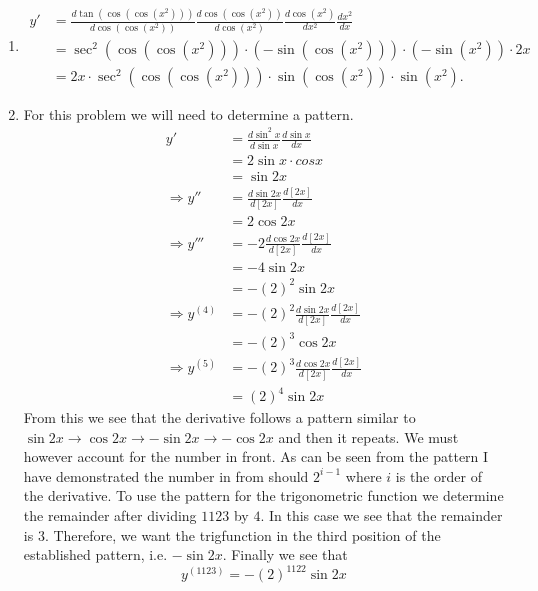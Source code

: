 \documentclass{hwset}
\begin{document}
\begin{enumerate}
	\item \begin{solution}
		\begin{align*}
			y' &= \frac{d\tan(\cos(\cos(x^2)))}{d\cos(\cos(x^2))}
			\frac{d\cos(\cos(x^2))}{d\cos(x^2)} \frac{d\cos(x^2)}{dx^2} \frac{dx^2}{dx}\\
			&= \sec^2(\cos(\cos(x^2)))\cdot \left( -\sin(\cos(x^2)) \right)\cdot
				\left( -\sin(x^2) \right)\cdot 2x \\
			&= \boxed{2x\cdot \sec^2(\cos(\cos(x^2)))\cdot \sin(\cos(x^2))\cdot
				\sin(x^2)}.
		\end{align*}
	\end{solution}
	\item \begin{solution} For this problem we will need to determine a pattern.
		\begin{align*}
			y' &= \frac{d\sin^2 x}{d\sin x}\frac{d\sin x}{dx}\\
			&= 2\sin x \cdot cos x \\
			&= \sin 2x \\
			\Rightarrow y'' &= \frac{d\sin 2x}{d[2x]}\frac{d[2x]}{dx} \\
			&= 2\cos 2x \\
			\Rightarrow y''' &= -2\frac{d\cos 2x}{d[2x]}\frac{d[2x]}{dx} \\
			&= -4 \sin 2x \\
			&= -(2)^2 \sin 2x \\
			\Rightarrow y^{(4)} &= -(2)^2\frac{d\sin 2x}{d[2x]}\frac{d[2x]}{dx} \\
			&= -(2)^3\cos 2x \\ 
			\Rightarrow y^{(5)} &= -(2)^3\frac{d\cos 2x}{d[2x]}\frac{d[2x]}{dx} \\
			&= (2)^4\sin 2x 
		\end{align*}
		From this we see that the derivative follows a pattern similar to $\sin 2x
		\rightarrow \cos 2x \rightarrow -\sin 2x \rightarrow -\cos 2x$ and then it
		repeats. We must however account for the number in front. As can be seen
		from the pattern I have demonstrated the number in from should $2^{i-1}$
		where $i$ is the order of the derivative. To use the pattern for the
		trigonometric function we determine the remainder after dividing $1123$ by
		$4$. In this case we see that the remainder is $3$. Therefore, we want the
		trigfunction in the third position of the established pattern, i.e. $-\sin
		2x$. Finally we see that
		\begin{equation*}
			\boxed{y^{(1123)} = -(2)^{1122} \sin 2x}
		\end{equation*}
	\end{solution}
\end{enumerate}
\end{document}
